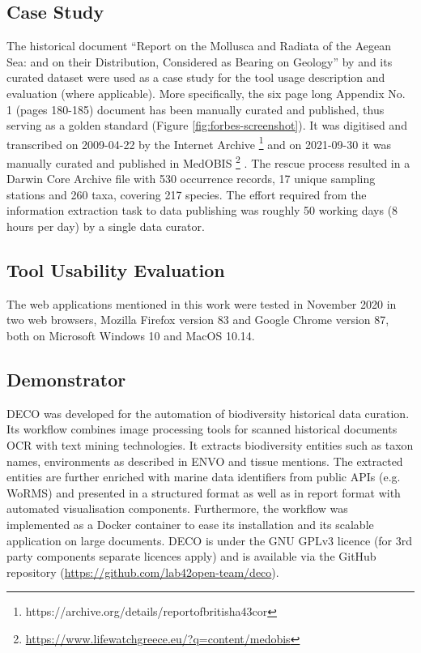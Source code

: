     \subsection{Case Study}
The historical document “Report on the Mollusca and Radiata of the Aegean Sea:
and on their Distribution, Considered as Bearing on Geology” by
\cite{WoRMS:SourceID:40714} and its curated dataset were used as a case study
for the tool usage description and evaluation (where applicable). More
specifically, the six page long Appendix No. 1 (pages 180-185) document has
been manually curated and published, thus serving as a golden standard
(Figure \ref{fig:forbes-screenshot}). It was digitised and transcribed on
2009-04-22 by the Internet Archive \footnote{https://archive.org/details/reportofbritisha43cor}
and on 2021-09-30 it was manually curated \cite{mavraki_digitization_2021} and
published in MedOBIS \footnote{\url{ https://www.lifewatchgreece.eu/?q=content/medobis}}
\cite{arvanitidis_medobis_2006}. The rescue process resulted in a Darwin Core
Archive file with 530 occurrence records, 17 unique sampling stations and
260 taxa, covering 217 species. The effort required from the information
extraction task to data publishing was roughly 50 working days (8 hours per day)
by a single data curator.

    \subsection{Tool Usability Evaluation}
The web applications mentioned in this work were tested in November 2020 in 
two web browsers, Mozilla Firefox version 83 and Google Chrome version 87,
both on Microsoft Windows 10 and MacOS 10.14.

    \subsection{Demonstrator}

DECO was developed for the automation of biodiversity historical data
curation. Its workflow combines image processing tools for scanned historical
documents OCR with text mining technologies. It extracts biodiversity entities
such as taxon names, environments as described in ENVO and tissue mentions.
The extracted entities are further enriched with marine data identifiers from
public APIs (e.g. WoRMS) and presented in a structured format as well as in
report format with automated visualisation components. Furthermore, the
workflow was implemented as a Docker container to ease its installation and its
scalable application on large documents. DECO is under the GNU GPLv3 licence
(for 3rd party components separate licences apply) and is available via the
GitHub repository (\url{https://github.com/lab42open-team/deco}).


